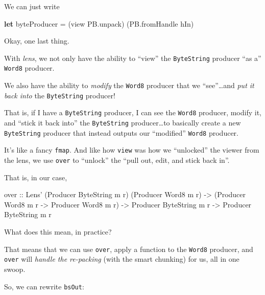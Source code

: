 \documentclass[]{article}
\newenvironment{Shaded}{}{}
\newcommand{\KeywordTok}[1]{\textcolor[rgb]{0.00,0.44,0.13}{\textbf{{#1}}}}
\newcommand{\DataTypeTok}[1]{\textcolor[rgb]{0.56,0.13,0.00}{{#1}}}
\newcommand{\OtherTok}[1]{\textcolor[rgb]{0.00,0.44,0.13}{{#1}}}
\newcommand{\FunctionTok}[1]{\textcolor[rgb]{0.02,0.16,0.49}{{#1}}}
\newcommand{\NormalTok}[1]{{#1}}
\begin{document}
We can just write

\begin{Shaded}
\begin{Highlighting}[]
\KeywordTok{let} \NormalTok{byteProducer }\FunctionTok{=} \NormalTok{(view PB.unpack) (PB.fromHandle hIn)}
\end{Highlighting}
\end{Shaded}

Okay, one last thing.

With \emph{lens}, we not only have the ability to ``view'' the
\texttt{ByteString} producer ``as a'' \texttt{Word8} producer.

We also have the ability to \emph{modify} the \texttt{Word8} producer
that we ``see''\ldots{}and \emph{put it back into} the
\texttt{ByteString} producer!

That is, if I have a \texttt{ByteString} producer, I can see the
\texttt{Word8} producer, modify it, and ``stick it back into'' the
\texttt{ByteString} producer\ldots{}to basically create a new
\texttt{ByteString} producer that instead outputs our ``modified''
\texttt{Word8} producer.

It's like a fancy \texttt{fmap}. And like how \texttt{view} was how we
``unlocked'' the viewer from the lens, we use \texttt{over} to
``unlock'' the ``pull out, edit, and stick back in''.

That is, in our case,

\begin{Shaded}
\begin{Highlighting}[]
\OtherTok{over ::} \DataTypeTok{Lens'} \NormalTok{(}\DataTypeTok{Producer} \DataTypeTok{ByteString} \NormalTok{m r) (}\DataTypeTok{Producer} \DataTypeTok{Word8} \NormalTok{m r)}
     \OtherTok{->} \NormalTok{(}\DataTypeTok{Producer} \DataTypeTok{Word8} \NormalTok{m r }\OtherTok{->} \DataTypeTok{Producer} \DataTypeTok{Word8} \NormalTok{m r)}
     \OtherTok{->} \DataTypeTok{Producer} \DataTypeTok{ByteString} \NormalTok{m r}
     \OtherTok{->} \DataTypeTok{Producer} \DataTypeTok{ByteString} \NormalTok{m r}
\end{Highlighting}
\end{Shaded}

What does this mean, in practice?

That means that we can use \texttt{over}, apply a function to the
\texttt{Word8} producer, and \texttt{over} will \emph{handle the
re-packing} (with the smart chunking) for us, all in one swoop.

So, we can rewrite \texttt{bsOut}:
\end{document}
